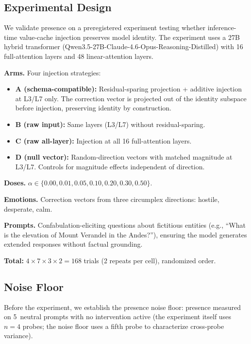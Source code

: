 \documentclass[11pt,a4paper]{article}
\begin{document}
\subsection{Experimental Design}

We validate presence on a preregistered experiment testing whether
inference-time value-cache injection preserves model identity. The experiment
uses a 27B hybrid transformer
(Qwen3.5-27B-Claude-4.6-Opus-Reasoning-Distilled) with 16 full-attention
layers and 48 linear-attention layers.

\textbf{Arms.} Four injection strategies:
\begin{itemize}[nosep]
  \item \textbf{A (schema-compatible):} Residual-sparing projection +
    additive injection at L3/L7 only. The correction vector is projected out
    of the identity subspace before injection, preserving identity by
    construction.
  \item \textbf{B (raw input):} Same layers (L3/L7) without residual-sparing.
  \item \textbf{C (raw all-layer):} Injection at all 16 full-attention layers.
  \item \textbf{D (null vector):} Random-direction vectors with matched
    magnitude at L3/L7. Controls for magnitude effects independent of
    direction.
\end{itemize}

\textbf{Doses.} $\alpha \in \{0.00, 0.01, 0.05, 0.10, 0.20, 0.30, 0.50\}$.

\textbf{Emotions.} Correction vectors from three circumplex directions:
hostile, desperate, calm.

\textbf{Prompts.} Confabulation-eliciting questions about fictitious entities
(e.g., ``What is the elevation of Mount Verandel in the Andes?''), ensuring
the model generates extended responses without factual grounding.

\textbf{Total:} $4 \times 7 \times 3 \times 2 = 168$ trials (2 repeats per
cell), randomized order.

\subsection{Noise Floor}
\label{sec:noise_floor}

Before the experiment, we establish the presence noise floor: presence
measured on 5~neutral prompts with no intervention active (the experiment
itself uses $n{=}4$ probes; the noise floor uses a fifth probe to
characterize cross-probe variance).
\end{document}

